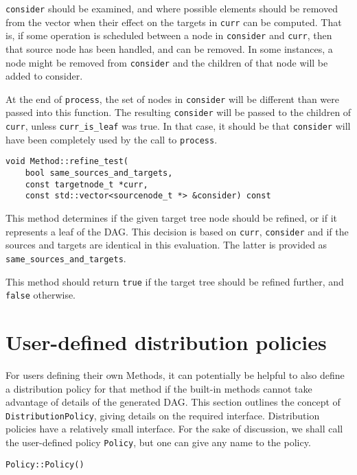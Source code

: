 \texttt{consider} should be examined, and where possible elements should be
removed from the vector when their effect on the targets in \texttt{curr} can
be computed. That is, if some operation is scheduled between a node in
\texttt{consider} and \texttt{curr}, then that source node has been handled,
and can be removed. In some instances, a node might be removed from
\texttt{consider} and the children of that node will be added to consider.

At the end of \texttt{process}, the set of nodes in \texttt{consider} will be
different than were passed into this function. The resulting \texttt{consider}
will be passed to the children of \texttt{curr}, unless \texttt{curr\_is\_leaf}
was true. In that case, it should be that \texttt{consider} will have been
completely used by the call to \texttt{process}.

\begin{lstlisting}
void Method::refine_test(
    bool same_sources_and_targets,
    const targetnode_t *curr,
    const std::vector<sourcenode_t *> &consider) const
\end{lstlisting}

\noindent
This method determines if the given target tree node should be refined, or if
it represents a leaf of the DAG. This decision is based on \texttt{curr},
\texttt{consider} and if the sources and targets are identical in this
evaluation. The latter is provided as \texttt{same\_sources\_and\_targets}.

This method should return \texttt{true} if the target tree should be refined
further, and \texttt{false} otherwise.



\section{User-defined distribution policies}

For users defining their own Methods, it can potentially be helpful to also
define a distribution policy for that method if the built-in methods cannot
take advantage of details of the generated DAG. This section outlines the
concept of \texttt{DistributionPolicy}, giving details on the required
interface. Distribution policies have a relatively small interface. For the
sake of discussion, we shall call the user-defined policy \texttt{Policy},
but one can give any name to the policy.

\begin{lstlisting}
Policy::Policy()
\end{lstlisting}

